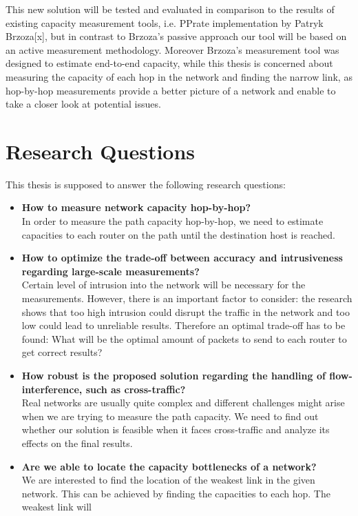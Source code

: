 This new solution will be tested and evaluated in comparison to the results of existing capacity measurement tools, i.e. PPrate implementation by Patryk Brzoza[x], but in contrast to Brzoza’s passive approach our tool will be based on an active measurement methodology. Moreover Brzoza’s measurement tool was designed to estimate end-to-end capacity, while this thesis is concerned about measuring the capacity of each hop in the network and finding the narrow link, as hop-by-hop measurements provide a better picture of a network and enable to take a closer look at potential issues.



\section{Research Questions}
This thesis is supposed to answer the following research questions:

\begin{itemize}
  \item \textbf{How to measure network capacity hop-by-hop?}
  \\In order to measure the path capacity hop-by-hop, we need to estimate capacities to each router on the path until the destination host is reached. 
  \item \textbf{How to optimize the trade-off between accuracy and intrusiveness regarding large-scale measurements?}
  \\Certain level of intrusion into the network will be necessary for the measurements. However, there is an important factor to consider: the research shows that too high intrusion could disrupt the traffic in the network and too low could lead to unreliable results. Therefore an optimal trade-off has to be found: What will be the optimal amount of packets to send to each router to get correct results?
  \item \textbf{How robust is the proposed solution regarding the handling of flow-interference, such as cross-traffic?}
  \\Real networks are usually quite complex and different challenges might arise when we are trying to measure the path capacity. We need to find out whether our solution is feasible when it faces cross-traffic and analyze its effects on the final results.
  \item \textbf{Are we able to locate the capacity bottlenecks of a network?}
  \\ We are interested to find the location of the weakest link in the given network. This can be achieved by finding the capacities to each hop. The weakest link will 
\end{itemize}

